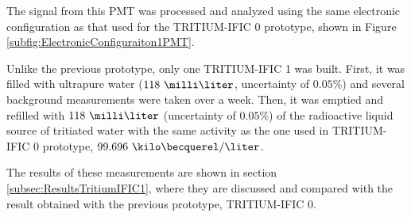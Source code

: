 The signal from this PMT was processed and analyzed using the same electronic configuration as that used for the TRITIUM-IFIC 0 prototype, shown in Figure \ref{subfig:ElectronicConfiguraiton1PMT}.

Unlike the previous prototype, only one TRITIUM-IFIC 1 was built. First, it was filled with ultrapure water ($118~\milli\liter$, uncertainty of $0.05\%$) and several background measurements were taken over a week. Then, it was emptied and refilled with $118~\milli\liter$ (uncertainty of $0.05\%$) of the radioactive liquid source of tritiated water with the same activity as the one used in TRITIUM-IFIC 0 prototype, $99.696~\kilo\becquerel/\liter$.

The results of these measurements are shown in section \ref{subsec:ResultsTritiumIFIC1}, where they are discussed and compared with the result obtained with the previous prototype, TRITIUM-IFIC 0.